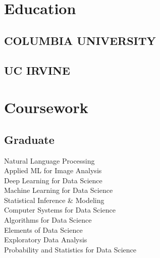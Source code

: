 \documentclass[]{deedy-resume-openfont}
\begin{document}
%
%


%
%

\begin{minipage}[t]{0.33\textwidth} 


\section{Education} 

\subsection{COLUMBIA UNIVERSITY}
\sectionsep

\subsection{UC IRVINE}
\sectionsep


\section{Coursework}
\subsection{Graduate} 
Natural Language Processing \\
Applied ML for Image Analysis \\
Deep Learning for Data Science \\
Machine Learning for Data Science \\
Statistical Inference \& Modeling \\
Computer Systems for Data Science \\
Algorithms for Data Science \\
Elements of Data Science \\
Exploratory Data Analysis \\
Probability and Statistics for Data Science \\

\end{minipage}
\end{document}
